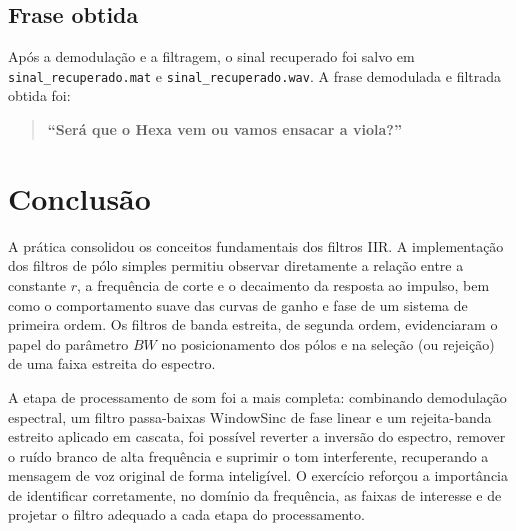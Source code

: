 \documentclass[12pt,a4paper]{article}
\begin{document}
\subsection*{Frase obtida}
Ap\'os a demodula\c{c}\~ao e a filtragem, o sinal recuperado foi salvo em
\texttt{sinal\_recuperado.mat} e \texttt{sinal\_recuperado.wav}. A frase
demodulada e filtrada obtida foi:
\begin{quote}
\textbf{``Ser\'a que o Hexa vem ou vamos ensacar a viola?''}
\end{quote}

\section{Conclus\~ao}
A pr\'atica consolidou os conceitos fundamentais dos filtros IIR. A
implementa\c{c}\~ao dos filtros de p\'olo simples permitiu observar diretamente a
rela\c{c}\~ao entre a constante $r$, a frequ\^encia de corte e o decaimento da
resposta ao impulso, bem como o comportamento suave das curvas de ganho e fase
de um sistema de primeira ordem. Os filtros de banda
estreita, de segunda ordem, evidenciaram o papel do par\^ametro $BW$ no
posicionamento dos p\'olos e na sele\c{c}\~ao (ou rejei\c{c}\~ao) de uma faixa
estreita do espectro.

A etapa de processamento de som foi a mais completa: combinando demodula\c{c}\~ao
espectral, um filtro passa-baixas WindowSinc de fase linear e um rejeita-banda
estreito aplicado em cascata, foi poss\'ivel reverter a invers\~ao do espectro,
remover o ru\'ido branco de alta frequ\^encia e suprimir o tom interferente,
recuperando a mensagem de voz original de forma intelig\'ivel. O exerc\'icio
refor\c{c}ou a import\^ancia de identificar corretamente, no dom\'inio da
frequ\^encia, as faixas de interesse e de projetar o filtro adequado a cada etapa
do processamento.
\end{document}
